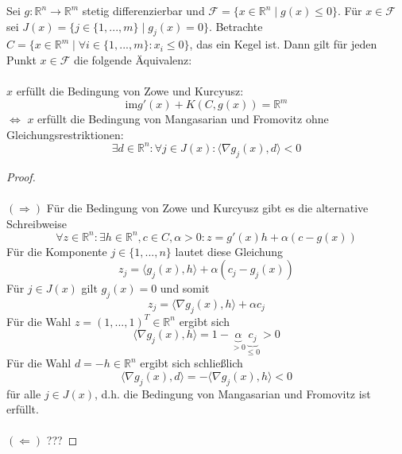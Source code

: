 
Sei $g: \mathbb R^n\to \mathbb R^m$ stetig differenzierbar und $\mathcal F=\{x\in\mathbb R^n\mid g(x)\leq 0\}$. Für $x\in\mathcal F$ sei $J(x)=\{j\in\{1,...,m\}\mid g_j(x)=0\}$. Betrachte $C=\{x\in\mathbb R^m\mid \forall i\in\{1,...,m\}:x_i\leq 0\}$, das ein Kegel ist. Dann gilt für jeden Punkt $x\in\mathcal F$ die folgende Äquivalenz:\\\\
$x$ erfüllt die Bedingung von Zowe und Kurcyusz: $$\text{im} g'(x)+K(C,g(x))=\mathbb R^m$$
$\Leftrightarrow$ $x$ erfüllt die Bedingung von Mangasarian und Fromovitz ohne Gleichungsrestriktionen:
$$\exists d\in\mathbb R^n:\forall j\in J(x):\langle \nabla g_j(x),d\rangle < 0$$
\begin{proof}~\\\\
$(\Rightarrow)$ Für die Bedingung von Zowe und Kurcyusz gibt es die alternative Schreibweise
$$\forall z\in\mathbb R^n: \exists h\in\mathbb R^n,c\in C, \alpha>0: z=g'(x)h+\alpha(c-g(x))$$
Für die Komponente $j\in\{1,...,n \}$ lautet diese Gleichung
$$z_j=\langle g_j(x),h\rangle+\alpha(c_j-g_j(x))$$
Für $j\in J(x)$ gilt $g_j(x)=0$ und somit
$$z_j=\langle \nabla g_j(x),h\rangle+\alpha c_j$$
Für die Wahl $z=(1,...,1)^T\in\mathbb R^n$ ergibt sich
$$\langle \nabla g_j(x),h\rangle=1-\underbrace{\alpha}_{>0} \underbrace{c_j}_{\leq0}>0$$
Für die Wahl $d=-h\in\mathbb R^n$ ergibt sich schließlich
$$\langle \nabla g_j(x),d\rangle=-\langle \nabla g_j(x),h\rangle<0$$
für alle $j\in J(x)$, d.h. die Bedingung von Mangasarian und Fromovitz ist erfüllt.
\\\\
$(\Leftarrow)$ ???
\end{proof}